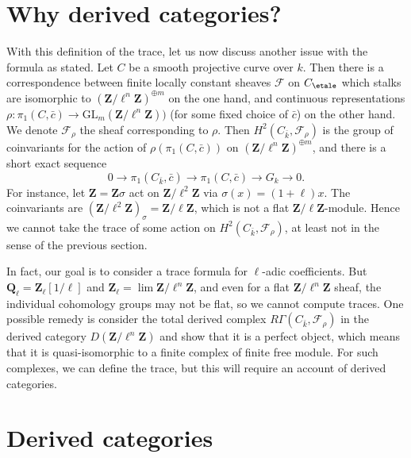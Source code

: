 \section{Why derived categories?}
\label{section-derived-categories-why}

\noindent
With this definition of the trace, let us now discuss another issue with the
formula as stated. Let $C$ be a smooth projective curve over $k$. Then there is
a correspondence between finite locally constant sheaves $\mathcal{F}$ on
$C_\etale$ which stalks are isomorphic to
${(\mathbf{Z}/\ell^n\mathbf{Z})}^{\oplus m}$ on the one hand, and continuous
representations $\rho : \pi_1 (C, \bar c) \to
\text{GL}_m(\mathbf{Z}/\ell^n\mathbf{Z}))$ (for some fixed choice of $\bar c$)
on the other hand. We denote $\mathcal{F}_\rho$ the sheaf corresponding to
$\rho$. Then $H^2 (C_{\bar k}, \mathcal{F}_\rho)$ is the group of coinvariants
for the action of $\rho(\pi_1 (C, \bar c))$ on
${(\mathbf{Z}/\ell^n\mathbf{Z})}^{\oplus m}$, and there is a short exact
sequence
$$
0 \longrightarrow \pi_1 (C_{\bar k}, \bar c) \longrightarrow \pi_1 (C, \bar c)
\longrightarrow G_k \longrightarrow 0.
$$
For instance, let $\mathbf{Z} = \mathbf{Z} \sigma$ act on
$\mathbf{Z}/\ell^2\mathbf{Z}$ via $\sigma(x) = (1+\ell) x$. The coinvariants
are $(\mathbf{Z}/\ell^2\mathbf{Z})_{\sigma} = \mathbf{Z}/\ell\mathbf{Z}$, which
is not a flat $\mathbf{Z}/\ell\mathbf{Z}$-module. Hence we cannot take the
trace of some action on $H^2(C_{\bar k}, \mathcal{F}_\rho)$, at least not in
the sense of the previous section.

\medskip\noindent
In fact, our goal is to consider a trace formula for $\ell$-adic coefficients.
But $\mathbf{Q}_\ell = \mathbf{Z}_\ell[1/\ell]$ and $\mathbf{Z}_\ell =
\lim \mathbf{Z}/\ell^n\mathbf{Z}$, and even for a flat
$\mathbf{Z}/\ell^n\mathbf{Z}$ sheaf, the individual cohomology groups may not
be flat, so we cannot compute traces. One possible remedy is consider the total
derived complex $R\Gamma(C_{\bar k}, \mathcal{F}_\rho)$ in the derived category
$D(\mathbf{Z}/\ell^n\mathbf{Z})$ and show that it is a perfect object, which
means that it is quasi-isomorphic to a finite complex of finite free module.
For such complexes, we can define the trace, but this will require an account
of derived categories.






\section{Derived categories}
\label{section-derived-categories}

